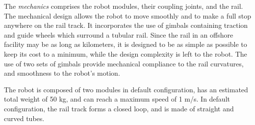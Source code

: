 \documentclass{ifacconf}
\begin{document}
%

The \emph{mechanics} comprises the robot modules, their coupling joints, and the
rail. The mechanical design allows the robot to move smoothly and
to make a full stop anywhere on the rail track. It incorporates the use of
gimbals containing traction and guide wheels which surround a tubular rail.
Since the rail in an offshore facility may be as long as kilometers, it is
designed to be as simple as possible to keep its cost to a minimum, while the
design complexity is left to the robot. The use of two sets of gimbals provide
mechanical compliance to the rail curvatures, and smoothness to the robot's
motion.

The robot is composed of two modules in default configuration, has an estimated
total weight of 50 kg, and can reach a maximum speed of 1 m/s. In default
configuration, the rail track forms a closed loop, and is made of straight and 
curved tubes.
\end{document}
